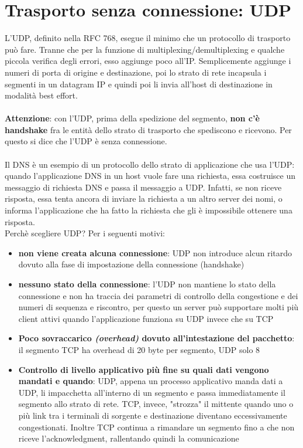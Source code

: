 \documentclass[11pt,a4paper]{book}
\begin{document}
\section{Trasporto senza connessione: UDP}
L'UDP, definito nella RFC 768, esegue il minimo che un protocollo di trasporto può fare. Tranne che per la funzione di multiplexing/demultiplexing e qualche piccola verifica degli errori, esso aggiunge poco all'IP. Semplicemente aggiunge i numeri di porta di origine e destinazione, poi lo strato di rete incapsula i segmenti in un datagram IP e quindi poi li invia all'host di destinazione in modalità best effort. \\ \\
\textbf{Attenzione}: con l'UDP, prima della spedizione del segmento, \textbf{non c'è handshake} fra le entità dello strato di trasporto che spediscono e ricevono. Per questo si dice che l'UDP è senza connessione. \\ \\
Il DNS è un esempio di un protocollo dello strato di applicazione che usa l'UDP: quando l'applicazione DNS in un host vuole fare una richiesta, essa costruisce un messaggio di richiesta DNS e passa il messaggio a UDP. Infatti, se non riceve risposta, essa tenta ancora di inviare la richiesta a un altro server dei nomi, o informa l'applicazione che ha fatto la richiesta che gli è impossibile ottenere una risposta. \\
Perchè scegliere UDP? Per i seguenti motivi:
\begin{itemize}
	\item \textbf{non viene creata alcuna connessione}: UDP non introduce alcun ritardo dovuto alla fase di impostazione della connessione (handshake)
	\item \textbf{nessuno stato della connessione}: l'UDP non mantiene lo stato della connessione e non ha traccia dei parametri di controllo della congestione e dei numeri di sequenza e riscontro, per questo un server può supportare molti più client attivi quando l'applicazione funziona su UDP invece che su TCP
	\item \textbf{Poco sovraccarico \textit{(overhead)} dovuto all'intestazione del pacchetto}: il segmento TCP ha overhead di 20 byte per segmento, UDP solo 8
	\item \textbf{Controllo di livello applicativo più fine su quali dati vengono mandati e quando}: UDP, appena un processo applicativo manda dati a UDP, li impacchetta all'interno di un segmento e passa immediatamente il segmento allo strato di rete. TCP, invece, "strozza" il mittente quando uno o più link tra i terminali di sorgente e destinazione diventano eccessivamente congestionati. Inoltre TCP continua a rimandare un segmento fino a che non riceve l'acknowledgment, rallentando quindi la comunicazione
\end{itemize}
\end{document}
